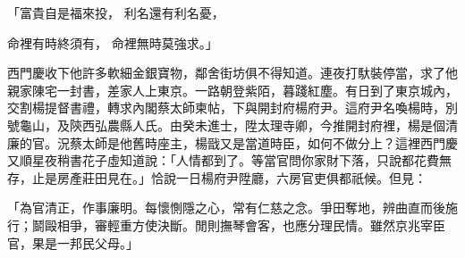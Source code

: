 「富貴自是福來投，  利名還有利名憂，

命裡有時終須有，  命裡無時莫強求。」

西門慶收下他許多軟細金銀寶物，鄰舍街坊俱不得知道。連夜打馱裝停當，求了他親家陳宅一封書，差家人上東京。一路朝登紫陌，暮踐紅塵。有日到了東京城內，交割楊提督書禮，轉求內閣蔡太師柬帖，下與開封府楊府尹。這府尹名喚楊時，別號龜山，及陝西弘農縣人氏。由癸未進士，陞太理寺卿，今推開封府裡，楊是個清廉的官。況蔡太師是他舊時座主，楊戩又是當道時臣，如何不做分上？這裡西門慶又順星夜稍書花子虛知道說：「人情都到了。等當官問你家財下落，只說都花費無存，止是房產莊田見在。」恰說一日楊府尹陞廳，六房官吏俱都祇候。但見：

「為官清正，作事廉明。每懷惻隱之心，常有仁慈之念。爭田奪地，辨曲直而後施行；鬬毆相爭，審輕重方使決斷。閒則撫琴會客，也應分理民情。雖然京兆宰臣官，果是一邦民父母。」

